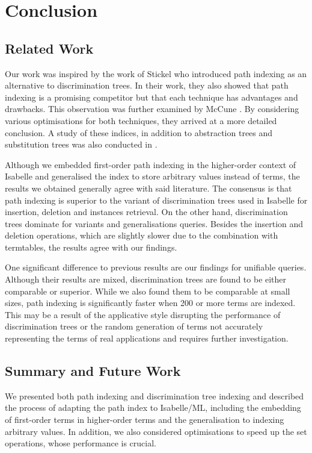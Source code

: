 \chapter{Conclusion}
\section{Related Work}
Our work was inspired by the work of Stickel \cite{stickel_path-indexing_1989} who introduced path indexing as an alternative to discrimination trees. In their work, they also showed that path indexing is a promising competitor but that each technique has advantages and drawbacks. This observation was further examined by McCune \cite{mccune_experiments_1992}. By considering various optimisations for both techniques, they arrived at a more detailed conclusion. A study of these indices, in addition to abstraction trees and substitution trees was also conducted in \cite{carbonell_comparison_1995}.

Although we embedded first-order path indexing in the higher-order context of Isabelle and generalised the index to store arbitrary values instead of terms, the results we obtained generally agree with said literature. The consensus is that path indexing is superior to the variant of discrimination trees used in Isabelle for insertion, deletion and instances retrieval. On the other hand, discrimination trees dominate for variants and generalisations queries. Besides the insertion and deletion operations, which are slightly slower due to the combination with termtables, the results agree with our findings.

One significant difference to previous results are our findings for unifiable queries. Although their results are mixed, discrimination trees are found to be either comparable or superior. While we also found them to be comparable at small sizes, path indexing is significantly faster when 200 or more terms are indexed. This may be a result of the applicative style disrupting the performance of discrimination trees or the random generation of terms not accurately representing the terms of real applications and requires further investigation.

\section{Summary and Future Work}
We presented both path indexing and discrimination tree indexing and described the process of adapting the path index to Isabelle/ML, including the embedding of first-order terms in higher-order terms and the generalisation to indexing arbitrary values. In addition, we also considered optimisations to speed up the set operations, whose performance is crucial.

